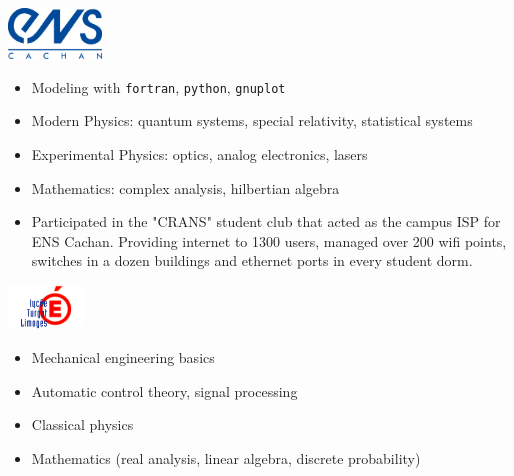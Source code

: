 \noindent
\begin{minipage}{.10\textwidth}
\centerline{\includegraphics[width=25mm]{img/ens}}
\end{minipage}
\hspace{5mm}
\begin{minipage}{.90\textwidth}
\raggedright
\begin{minipage}[t]{.50\textwidth}
	\begin{itemize}
		\item Modeling with \texttt{fortran}, \texttt{python}, \texttt{gnuplot}
		\item Modern Physics: quantum systems, special relativity, statistical systems
		\item Experimental Physics: optics, analog electronics, lasers
		\item Mathematics: complex analysis, hilbertian algebra
	\end{itemize}
\end{minipage}
\begin{minipage}[t]{.45\textwidth}
	\begin{itemize}
		\item Participated in the "CRANS" student club that acted as the campus ISP for ENS Cachan. Providing internet to 1300 users, managed over 200 wifi points, switches in a dozen buildings and ethernet ports in every student dorm.
	\end{itemize}
\end{minipage}
\end{minipage}

\noindent
\begin{minipage}{.15\textwidth}
	\centerline{\includegraphics[width=20mm]{img/turgot}}
\end{minipage}%
\hspace{5mm}
\begin{minipage}{.7\textwidth}
	\raggedright
	\begin{itemize}
		\item Mechanical engineering basics
		\item Automatic control theory, signal processing
		\item Classical physics
		\item Mathematics (real analysis, linear algebra, discrete probability)
	\end{itemize}
\end{minipage}
